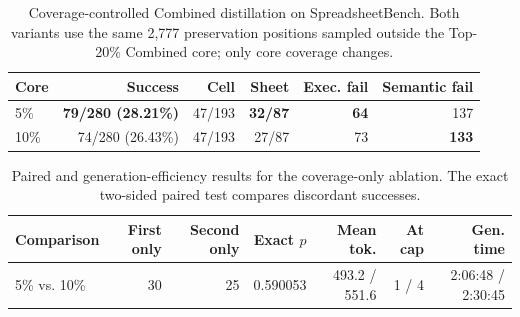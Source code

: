 
\begin{table}[t]
  \centering
  \small
  \caption{Coverage-controlled Combined distillation on SpreadsheetBench.
  Both variants use the same 2,777 preservation positions sampled outside
  the Top-20\% Combined core; only core coverage changes.}
  \label{tab:combined-coverage-test280}
  \begin{tabular}{lrrrrr}
    \toprule
    Core & Success & Cell & Sheet & Exec. fail & Semantic fail \\
    \midrule
    5\%  & \textbf{79/280 (28.21\%)} & 47/193 & \textbf{32/87} & \textbf{64} & 137 \\
    10\% & 74/280 (26.43\%) & 47/193 & 27/87 & 73 & \textbf{133} \\
    \bottomrule
  \end{tabular}
\end{table}

\begin{table}[t]
  \centering
  \small
  \caption{Paired and generation-efficiency results for the coverage-only
  ablation. The exact two-sided paired test compares discordant successes.}
  \label{tab:combined-coverage-paired}
  \begin{tabular}{lrrrrrr}
    \toprule
    Comparison & First only & Second only & Exact $p$ & Mean tok. & At cap & Gen. time \\
    \midrule
    5\% vs. 10\% & 30 & 25 & 0.590053 & 493.2 / 551.6 & 1 / 4 & 2:06:48 / 2:30:45 \\
    \bottomrule
  \end{tabular}
\end{table}
